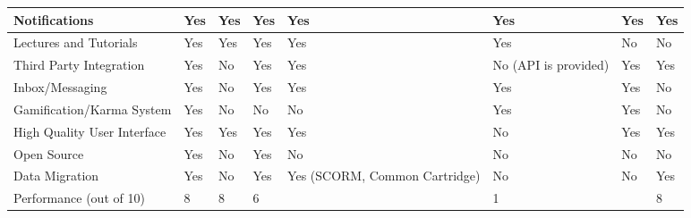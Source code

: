 \begin{table}[ht]
{\begin{tabular}{llllllll}
        \multicolumn{1}{|l|}{Notifications}               & \multicolumn{1}{l|}{Yes} & \multicolumn{1}{l|}{Yes} & \multicolumn{1}{l|}{Yes} & \multicolumn{1}{l|}{Yes} & \multicolumn{1}{l|}{Yes}                       & \multicolumn{1}{l|}{Yes} & \multicolumn{1}{l|}{Yes} \\ \hline
        \multicolumn{1}{|l|}{Lectures and Tutorials}      & \multicolumn{1}{l|}{Yes} & \multicolumn{1}{l|}{Yes} & \multicolumn{1}{l|}{Yes} & \multicolumn{1}{l|}{Yes} & \multicolumn{1}{l|}{Yes}                       & \multicolumn{1}{l|}{No} & \multicolumn{1}{l|}{No} \\ \hline
        \multicolumn{1}{|l|}{Third Party Integration}     & \multicolumn{1}{l|}{Yes} & \multicolumn{1}{l|}{No} & \multicolumn{1}{l|}{Yes} & \multicolumn{1}{l|}{Yes} & \multicolumn{1}{l|}{No (API is provided)}      & \multicolumn{1}{l|}{Yes} & \multicolumn{1}{l|}{Yes} \\ \hline
        \multicolumn{1}{|l|}{Inbox/Messaging}             & \multicolumn{1}{l|}{Yes} & \multicolumn{1}{l|}{No} & \multicolumn{1}{l|}{Yes} & \multicolumn{1}{l|}{Yes} & \multicolumn{1}{l|}{Yes}                       & \multicolumn{1}{l|}{Yes} & \multicolumn{1}{l|}{No} \\ \hline
        \multicolumn{1}{|l|}{Gamification/Karma System}   & \multicolumn{1}{l|}{Yes} & \multicolumn{1}{l|}{No} & \multicolumn{1}{l|}{No} & \multicolumn{1}{l|}{No} & \multicolumn{1}{l|}{Yes}                       & \multicolumn{1}{l|}{Yes} & \multicolumn{1}{l|}{No} \\ \hline
        \multicolumn{1}{|l|}{High Quality User Interface} & \multicolumn{1}{l|}{Yes} & \multicolumn{1}{l|}{Yes} & \multicolumn{1}{l|}{Yes} & \multicolumn{1}{l|}{Yes} & \multicolumn{1}{l|}{No}                        & \multicolumn{1}{l|}{Yes} & \multicolumn{1}{l|}{Yes} \\ \hline
        \multicolumn{1}{|l|}{Open Source}                 & \multicolumn{1}{l|}{Yes} & \multicolumn{1}{l|}{No} & \multicolumn{1}{l|}{Yes} & \multicolumn{1}{l|}{No} & \multicolumn{1}{l|}{No}                        & \multicolumn{1}{l|}{No} & \multicolumn{1}{l|}{No} \\ \hline
        \multicolumn{1}{|l|}{Data Migration}              & \multicolumn{1}{l|}{Yes} & \multicolumn{1}{l|}{No} & \multicolumn{1}{l|}{Yes} & \multicolumn{1}{l|}{Yes (SCORM, Common Cartridge)} & \multicolumn{1}{l|}{No}                        & \multicolumn{1}{l|}{No} & \multicolumn{1}{l|}{Yes} \\ \hline
        Performance (out of 10)                           & 8                      & 8                      & 6                      &                       & 1                                              &                       & 8                      \\ \hline
    \end{tabular}}
\end{table}








